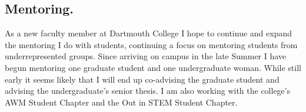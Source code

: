 \documentclass[11pt,reqno]{amsart}
\theoremstyle{remark}
\begin{document}
\subsection{Mentoring.} As a new faculty member at Dartmouth College I hope to continue and expand the mentoring I do with students, continuing a focus on mentoring students from underrepresented groups. Since arriving on campus in the late Summer I have begun mentoring one graduate student and one undergraduate woman. While still early it seems likely that I will end up co-advising the graduate student and advising the undergraduate's senior thesis. I am also working with the college's AWM Student Chapter and the Out in STEM Student Chapter. 


\newpage
\renewcommand{\bibliofont}{\normalsize}



\end{document}
